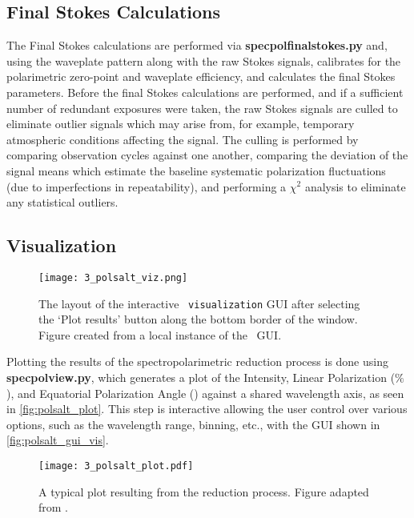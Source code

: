 \subsection{Final Stokes Calculations} \label{subsec:pol_fstokes}

The Final Stokes calculations are performed via \textbf{specpolfinalstokes.py} and, using the waveplate pattern along with the raw Stokes signals, calibrates for the polarimetric zero-point and waveplate efficiency, and calculates the final Stokes parameters. Before the final Stokes calculations are performed, and if a sufficient number of redundant exposures were taken, the raw Stokes signals are culled to eliminate outlier signals which may arise from, for example, temporary atmospheric conditions affecting the signal. The culling is performed by comparing observation cycles against one another, comparing the deviation of the signal means which estimate the baseline systematic polarization fluctuations (due to imperfections in repeatability), and performing a $\chi^2$ analysis to eliminate any statistical outliers.

\subsection{Visualization} \label{subsec:pol_viz}

\begin{figure}[t]
    \centering
    \texttt{[image: 3\_polsalt\_viz.png]}
    \caption{The layout of the interactive \polsalt\ \texttt{visualization} \gls{GUI} after selecting the `Plot results' button along the bottom border of the window. Figure created from a local instance of the \polsalt\ \gls{GUI}.}
    \label{fig:polsalt_gui_vis}
\end{figure}

Plotting the results of the spectropolarimetric reduction process is done using \textbf{specpol\-view.py}, which generates a plot of the Intensity, Linear Polarization ($\%$), and Equatorial Polarization Angle (\degree) against a shared wavelength axis, as seen in \autoref{fig:polsalt_plot}. This step is interactive allowing the user control over various options, such as the wavelength range, binning, etc., with the \gls{GUI} shown in \autoref{fig:polsalt_gui_vis}.

\begin{figure}[t]
    \centering
    \texttt{[image: 3\_polsalt\_plot.pdf]}
    \caption{A typical plot resulting from the reduction process. Figure adapted from \citep{Cooper_HEASA2021}.}
    \label{fig:polsalt_plot}
\end{figure}

